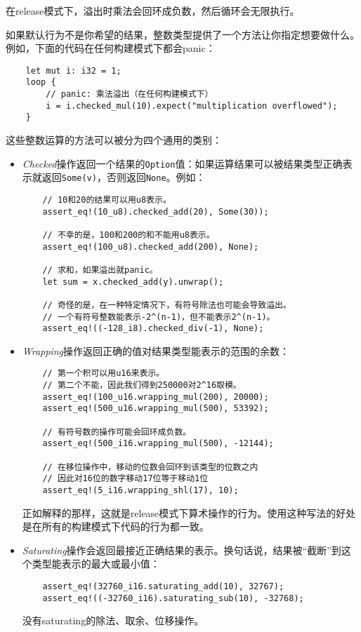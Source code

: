 在release模式下，溢出时乘法会回环成负数，然后循环会无限执行。

如果默认行为不是你希望的结果，整数类型提供了一个方法让你指定想要做什么。例如，下面的代码在任何构建模式下都会panic：
\begin{verbatim}
    let mut i: i32 = 1;
    loop {
        // panic: 乘法溢出（在任何构建模式下）
        i = i.checked_mul(10).expect("multiplication overflowed");
    }
\end{verbatim}

这些整数运算的方法可以被分为四个通用的类别：
\begin{itemize}
    \item \emph{Checked}操作返回一个结果的\texttt{Option}值：如果运算结果可以被结果类型正确表示就返回\texttt{Some(v)}，否则返回\texttt{None}。例如：
    \begin{verbatim}
    // 10和20的结果可以用u8表示。
    assert_eq!(10_u8).checked_add(20), Some(30));

    // 不幸的是，100和200的和不能用u8表示。
    assert_eq!(100_u8).checked_add(200), None);

    // 求和，如果溢出就panic。
    let sum = x.checked_add(y).unwrap();

    // 奇怪的是，在一种特定情况下，有符号除法也可能会导致溢出。
    // 一个有符号整数能表示-2^(n-1)，但不能表示2^(n-1)。
    assert_eq!((-128_i8).checked_div(-1), None);
    \end{verbatim}

    \item \emph{Wrapping}操作返回正确的值对结果类型能表示的范围的余数：
    \begin{verbatim}
    // 第一个积可以用u16来表示。
    // 第二个不能，因此我们得到250000对2^16取模。
    assert_eq!(100_u16.wrapping_mul(200), 20000);
    assert_eq!(500_u16.wrapping_mul(500), 53392);

    // 有符号数的操作可能会回环成负数。
    assert_eq!(500_i16.wrapping_mul(500), -12144);

    // 在移位操作中，移动的位数会回环到该类型的位数之内
    // 因此对16位的数字移动17位等于移动1位
    assert_eq!(5_i16.wrapping_shl(17), 10);
    \end{verbatim}
    正如解释的那样，这就是release模式下算术操作的行为。使用这种写法的好处是在所有的构建模式下代码的行为都一致。

    \item \emph{Saturating}操作会返回最接近正确结果的表示。换句话说，结果被“截断”到这个类型能表示的最大或最小值：
    \begin{verbatim}
    assert_eq!(32760_i16.saturating_add(10), 32767);
    assert_eq!((-32760_i16).saturating_sub(10), -32768);
    \end{verbatim}
    没有saturating的除法、取余、位移操作。


\end{itemize}
